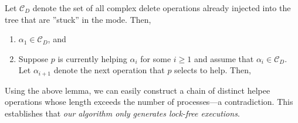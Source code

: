 \begin{lemma}
Let $\mathcal{C}_D$ denote the set of all complex delete operations already injected into the tree that are ''stuck'' in the \discovery{} mode. 
Then,
\begin{enumerate}[leftmargin=*, noitemsep]
\item $\alpha_1 \in \mathcal{C}_D$, and
\item Suppose $p$ is currently helping $\alpha_i$  for some $i \geq 1$ and assume that $\alpha_i \in \mathcal{C}_D$. Let $\alpha_{i+1}$ denote the next operation that $p$ selects to help. Then, 
\end{enumerate}
\end{lemma}


Using the above lemma, we can easily construct a chain of distinct helpee operations whose length exceeds the number of processes---a contradiction. 
This establishes that \emph{our algorithm only generates lock-free executions}.

\begin{comment}
Thus, we have:


\begin{theorem}
Every execution of our algorithm is lock-free.
\end{theorem}

\end{comment}